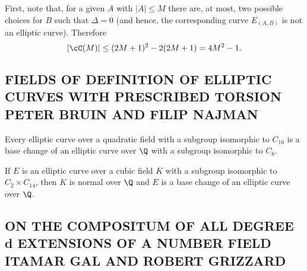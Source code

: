 First, note that, for a given $A$ with $|A| \leq M$ there are, at most, two possible choices for $B$ such that $\Delta= 0$ (and hence, the corresponding curve $E_{(A,B)}$ is not an elliptic curve). Therefore
	\[
	|\cC(M)| \leq (2M + 1)^2 - 2(2M + 1)= 4M^2 - 1.
	\]
























\subsection{FIELDS OF DEFINITION OF ELLIPTIC CURVES WITH PRESCRIBED TORSION PETER BRUIN AND FILIP NAJMAN}


\begin{thm}[1.1]
Every elliptic curve over a quadratic field with a subgroup isomorphic to $C_{16}$ is a base change of an elliptic curve over $\Q$ with a subgroup isomorphic to $C_8$.
\end{thm}


\begin{thm}[1.2]
If $E$ is an elliptic curve over a cubic field $K$ with a subgroup isomorphic to $C_2 \times C_{14}$, then $K$ is normal over $\Q$ and $E$ is a base change of an elliptic curve over $\Q$. 
\end{thm}






\subsection{ON THE COMPOSITUM OF ALL DEGREE d EXTENSIONS OF A NUMBER FIELD ITAMAR GAL AND ROBERT GRIZZARD}

